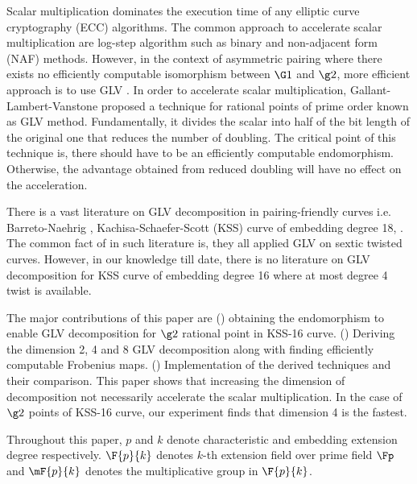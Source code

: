 Scalar multiplication dominates the execution time of any elliptic curve cryptography (ECC) algorithms.
The common approach to accelerate scalar multiplication are log-step algorithm such as binary and non-adjacent form (NAF) methods.
However, in the context of asymmetric pairing where there exists no efficiently computable isomorphism between $\G1$ and $\g2$, more efficient approach is to use GLV \cite{sakemi_skew, khandaker2017improvement}.
In order to accelerate scalar multiplication, Gallant-Lambert-Vanstone \cite{gallant2001faster} proposed a technique for rational points of prime order known as GLV method.
Fundamentally, it divides the scalar into half of the bit length of the original one that reduces the number of doubling.
The critical point of this technique is, there should have to be an efficiently computable endomorphism. 
Otherwise, the advantage obtained from reduced doubling will have no effect on the acceleration. 


There is a vast literature on GLV decomposition in pairing-friendly curves i.e.  Barreto-Naehrig \cite{BN}, Kachisa-Schaefer-Scott (KSS) curve of embedding degree 18,  \cite{sakemi_skew, khandaker2017improvement, nogami_scm_ate, faz2015efficient, galbraith2011endomorphisms}. 
The common fact of in such literature is, they all applied GLV on sextic twisted curves. 
However, in our knowledge till date, there is no literature on GLV decomposition for  KSS curve of embedding degree 16 where at most degree 4 twist is available.

The major contributions of this paper are () obtaining the endomorphism to enable GLV decomposition for $\g2$ rational point in KSS-16 curve. 
() Deriving the dimension 2, 4 and 8 GLV decomposition along with finding efficiently computable Frobenius maps. () Implementation of the derived techniques and their comparison. 
This paper shows that increasing the dimension of decomposition not necessarily accelerate the scalar multiplication. 
In the case of $\g2$ points of KSS-16 curve, our experiment finds that dimension 4 is the fastest. 

Throughout this paper, $p$ and $k$ denote characteristic and embedding extension degree respectively. $\F{p}{k}$ denotes $k$-th extension field over prime field $\Fp$ and $\mF{p}{k}$ denotes the multiplicative group in $\F{p}{k}$.

